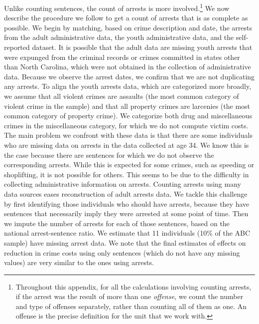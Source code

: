 \noindent Unlike counting sentences, the count of arrests is more involved.\footnote{Throughout this appendix, for all the calculations involving counting arrests, if the arrest was the result of more than one \textit{offense}, we count the number and type of offenses separately, rather than counting all of them as one. An offense is the precise definition for the unit that we work with.} We now describe the procedure we follow to get a count of arrests that is as complete as possible. We begin by matching, based on crime description and date, the arrests from the adult administrative data, the youth administrative data, and the self-reported dataset. It is possible that the adult data are missing youth arrests that were expunged from the criminal records or crimes committed in states other than North Carolina, which were not obtained in the collection of administrative data. Because we observe the arrest dates, we confirm that we are not duplicating any arrests. To align the youth arrests data, which are categorized more broadly, we assume that all violent crimes are assaults (the most common category of violent crime in the sample) and that all property crimes are larcenies (the most common category of property crime). We categorize both drug and miscellaneous crimes in the miscellaneous category, for which we do not compute victim costs. \\

\noindent The main problem we confront with these data is that there are some individuals who are missing data on arrests in the data collected at age 34. We know this is the case because there are sentences for which we do not observe the corresponding arrests. While this is expected for some crimes, such as speeding or shoplifting, it is not possible for others. This seems to be due to the difficulty in collecting administrative information on arrests. Counting arrests using many data sources eases  reconstruction of adult arrests data. We tackle this challenge by first identifying those individuals who should have arrests, because they have sentences that necessarily imply they were arrested at some point of time. Then we impute the number of arrests for each of those sentences, based on the national arrest-sentence ratio. We estimate that 11 individuals (10\% of the ABC sample) have missing arrest data. We note that the final estimates of effects on reduction in crime costs using only sentences (which do not have any missing values) are very similar to the ones using arrests. \\


